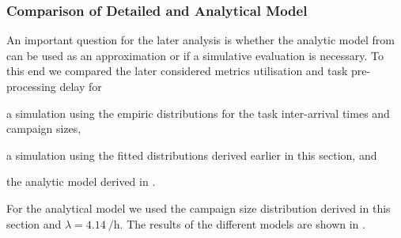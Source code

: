 \subsubsection*{Comparison of Detailed and Analytical Model}
An important question for the later analysis is whether the analytic model from  can be used as an approximation or if a simulative evaluation is necessary.
To this end we compared the later considered metrics utilisation \workerUtilization and task pre-processing delay \preTaskProcessingDelay for
\begin{enumerate*}
\item a simulation using the empiric distributions for the task inter-arrival times and campaign sizes,
\item a simulation using the fitted distributions derived earlier in this section, and
\item the analytic model derived in .
\end{enumerate*}
For the analytical model we used the campaign size distribution derived in this section and \(\lambda=\SI{4.14}{\per\hour}\).
The results of the different models are shown in .

